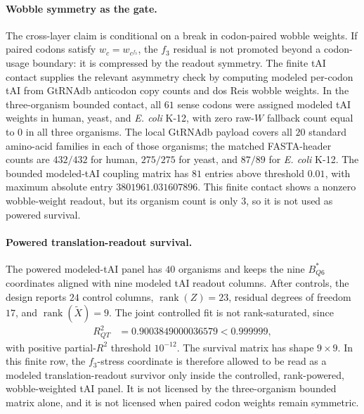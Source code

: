 \paragraph{Wobble symmetry as the gate.}
The cross-layer claim is conditional on a break in codon-paired wobble weights.  If paired codons satisfy $w_c=w_{c^{f_3}}$, the $f_3$ residual is not promoted beyond a codon-usage boundary: it is compressed by the readout symmetry.  The finite tAI contact supplies the relevant asymmetry check by computing modeled per-codon tAI from GtRNAdb anticodon copy counts and dos Reis wobble weights.  In the three-organism bounded contact, all $61$ sense codons were assigned modeled tAI weights in human, yeast, and \emph{E. coli} K-12, with zero raw-$W$ fallback count equal to $0$ in all three organisms.  The local GtRNAdb payload covers all $20$ standard amino-acid families in each of those organisms; the matched FASTA-header counts are $432/432$ for human, $275/275$ for yeast, and $87/89$ for \emph{E. coli} K-12.  The bounded modeled-tAI coupling matrix has $81$ entries above threshold $0.01$, with maximum absolute entry $3801961.031607896$.  This finite contact shows a nonzero wobble-weight readout, but its organism count is only $3$, so it is not used as powered survival.

\paragraph{Powered translation-readout survival.}
The powered modeled-tAI panel has $40$ organisms and keeps the nine $B^\ast_{Q6}$ coordinates aligned with nine modeled tAI readout columns.  After controls, the design reports $24$ control columns, $\operatorname{rank}(Z)=23$, residual degrees of freedom $17$, and $\operatorname{rank}(\widetilde X)=9$.  The joint controlled fit is not rank-saturated, since
$$
\begin{aligned}
R^2_{QT} &= 0.9003849000036579 < 0.999999,
\end{aligned}
$$
with positive partial-$R^2$ threshold $10^{-12}$.  The survival matrix has shape $9\times 9$.  In this finite row, the $f_3$-stress coordinate is therefore allowed to be read as a modeled translation-readout survivor only inside the controlled, rank-powered, wobble-weighted tAI panel.  It is not licensed by the three-organism bounded matrix alone, and it is not licensed when paired codon weights remain symmetric.

